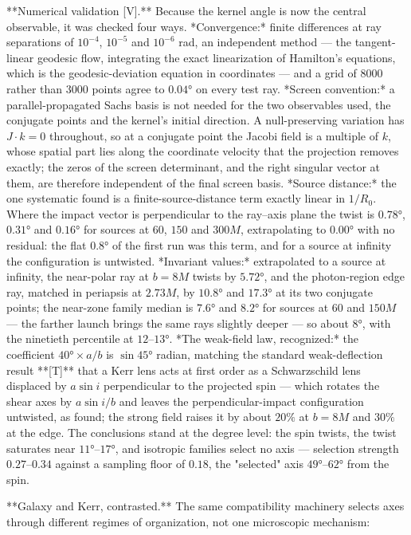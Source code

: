 **Numerical validation [V].** Because the kernel angle is now the central observable, it was checked four ways. *Convergence:* finite differences at ray separations of $10^{-4}$, $10^{-5}$ and $10^{-6}$ rad, an independent method — the tangent-linear geodesic flow, integrating the exact linearization of Hamilton's equations, which is the geodesic-deviation equation in coordinates — and a grid of $8000$ rather than $3000$ points agree to $0.04°$ on every test ray. *Screen convention:* a parallel-propagated Sachs basis is not needed for the two observables used, the conjugate points and the kernel's initial direction. A null-preserving variation has $J\cdot k = 0$ throughout, so at a conjugate point the Jacobi field is a multiple of $k$, whose spatial part lies along the coordinate velocity that the projection removes exactly; the zeros of the screen determinant, and the right singular vector at them, are therefore independent of the final screen basis. *Source distance:* the one systematic found is a finite-source-distance term exactly linear in $1/R_0$. Where the impact vector is perpendicular to the ray–axis plane the twist is $0.78°$, $0.31°$ and $0.16°$ for sources at $60$, $150$ and $300M$, extrapolating to $0.00°$ with no residual: the flat $0.8°$ of the first run was this term, and for a source at infinity the configuration is untwisted. *Invariant values:* extrapolated to a source at infinity, the near-polar ray at $b = 8M$ twists by $5.72°$, and the photon-region edge ray, matched in periapsis at $2.73M$, by $10.8°$ and $17.3°$ at its two conjugate points; the near-zone family median is $7.6°$ and $8.2°$ for sources at $60$ and $150M$ — the farther launch brings the same rays slightly deeper — so about $8°$, with the ninetieth percentile at $12$–$13°$. *The weak-field law, recognized:* the coefficient $40°\times a/b$ is $\sin45°$ radian, matching the standard weak-deflection result **[T]** that a Kerr lens acts at first order as a Schwarzschild lens displaced by $a\sin i$ perpendicular to the projected spin — which rotates the shear axes by $a\sin i/b$ and leaves the perpendicular-impact configuration untwisted, as found; the strong field raises it by about $20\%$ at $b = 8M$ and $30\%$ at the edge. The conclusions stand at the degree level: the spin twists, the twist saturates near $11°$–$17°$, and isotropic families select no axis — selection strength $0.27$–$0.34$ against a sampling floor of $0.18$, the "selected" axis $49°$–$62°$ from the spin.

**Galaxy and Kerr, contrasted.** The same compatibility machinery selects axes through different regimes of organization, not one microscopic mechanism:

